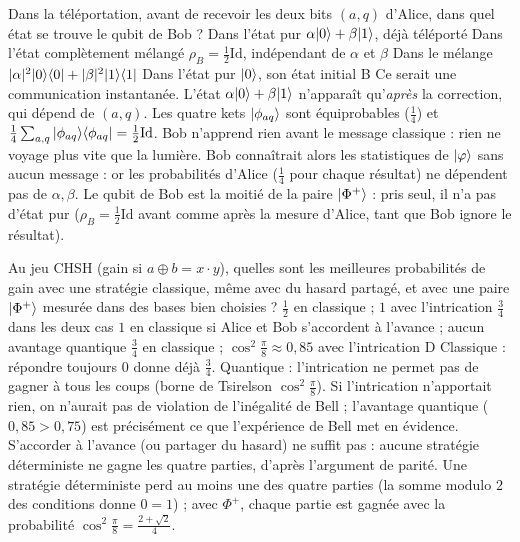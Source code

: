   {Dans la téléportation, avant de recevoir les deux bits $(a,q)$ d'Alice, dans quel état se trouve le qubit de Bob ?}
  {Dans l'état pur $\alpha|0\rangle+\beta|1\rangle$, déjà téléporté}
  {Dans l'état complètement mélangé $\rho_B=\frac12\mathrm{Id}$, indépendant de $\alpha$ et $\beta$}
  {Dans le mélange $|\alpha|^2|0\rangle\langle 0|+|\beta|^2|1\rangle\langle 1|$}
  {Dans l'état pur $|0\rangle$, son état initial}
  {B}
\qcmx
  {Ce serait une communication instantanée. L'état $\alpha|0\rangle+\beta|1\rangle$ n'apparaît qu'\emph{après} la correction, qui dépend de $(a,q)$.}
  {Les quatre kets $|\phi_{aq}\rangle$ sont équiprobables ($\frac14$) et $\frac14\sum_{a,q}|\phi_{aq}\rangle\langle \phi_{aq}|=\frac12\mathrm{Id}$. Bob n'apprend rien avant le message classique : rien ne voyage plus vite que la lumière.}
  {Bob connaîtrait alors les statistiques de $|\varphi\rangle$ sans aucun message : or les probabilités d'Alice ($\frac14$ pour chaque résultat) ne dépendent pas de $\alpha,\beta$.}
  {Le qubit de Bob est la moitié de la paire $|\Phi^+\rangle$ : pris seul, il n'a pas d'état pur ($\rho_B=\frac12\mathrm{Id}$ avant comme après la mesure d'Alice, tant que Bob ignore le résultat).}

  {Au jeu CHSH (gain si $a\oplus b=x\cdot y$), quelles sont les meilleures probabilités de gain avec une stratégie classique, même avec du hasard partagé, et avec une paire $|\Phi^+\rangle$ mesurée dans des bases bien choisies ?}
  {$\frac12$ en classique ; $1$ avec l'intrication}
  {$\frac34$ dans les deux cas}
  {$1$ en classique si Alice et Bob s'accordent à l'avance ; aucun avantage quantique}
  {$\frac34$ en classique ; $\cos^2\frac\pi8\approx0{,}85$ avec l'intrication}
  {D}
\qcmx
  {Classique : répondre toujours $0$ donne déjà $\frac34$. Quantique : l'intrication ne permet pas de gagner à tous les coups (borne de Tsirelson $\cos^2\frac\pi8$).}
  {Si l'intrication n'apportait rien, on n'aurait pas de violation de l'inégalité de Bell ; l'avantage quantique ($0{,}85>0{,}75$) est précisément ce que l'expérience de Bell met en évidence.}
  {S'accorder à l'avance (ou partager du hasard) ne suffit pas : aucune stratégie déterministe ne gagne les quatre parties, d'après l'argument de parité.}
  {Une stratégie déterministe perd au moins une des quatre parties (la somme modulo $2$ des conditions donne $0=1$) ; avec $\Phi^+$, chaque partie est gagnée avec la probabilité $\cos^2\frac\pi8=\frac{2+\sqrt2}{4}$.}

